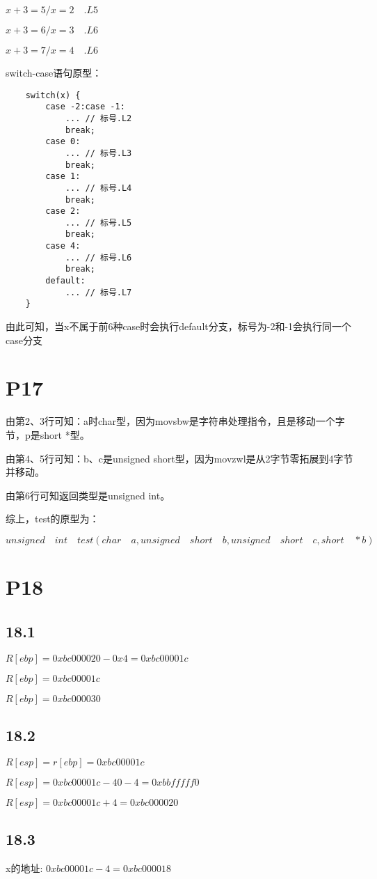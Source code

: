 \documentclass{article}
\begin{document}
$x+3=5/x=2 \quad .L5$

$x+3=6/x=3 \quad .L6$

$x+3=7/x=4 \quad .L6$

switch-case语句原型：

\begin{lstlisting}
	switch(x) {
		case -2:case -1:
			... // 标号.L2
			break;
		case 0:
			... // 标号.L3
			break;
		case 1:
			... // 标号.L4
			break;
		case 2:
			... // 标号.L5
			break;
		case 4:
			... // 标号.L6
			break;
		default:
			... // 标号.L7
	}

\end{lstlisting}

由此可知，当x不属于前6种case时会执行default分支，标号为-2和-1会执行同一个case分支
\section{P17}
由第2、3行可知：a时char型，因为movsbw是字符串处理指令，且是移动一个字节，p是short *型。

由第4、5行可知：b、c是unsigned short型，因为movzwl是从2字节零拓展到4字节并移动。

由第6行可知返回类型是unsigned int。

综上，test的原型为：

$unsigned \quad int \quad test(char \quad a, unsigned \quad short \quad b, unsigned \quad short \quad c, short \quad *b)$

\section{P18}
\subsection{18.1}
$R[ebp]=0xbc000020-0x4=0xbc00001c$

$R[ebp]=0xbc00001c$

$R[ebp]=0xbc000030$

\subsection{18.2}
$R[esp]=r[ebp]=0xbc00001c$

$R[esp]=0xbc00001c-40-4=0xbbfffff0$

$R[esp]=0xbc00001c+4=0xbc000020$

\subsection{18.3}
x的地址: $0xbc00001c-4=0xbc000018$
\end{document}
